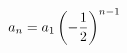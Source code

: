 \documentclass[preview]{standalone}
\begin{document}
\begin{align*}
\special{dvisvgm:raw <g id='unique000'>}a_n=a_1\left(-\frac{1}{2}\right)^{n-1}\special{dvisvgm:raw </g>}
\end{align*}
\end{document}

